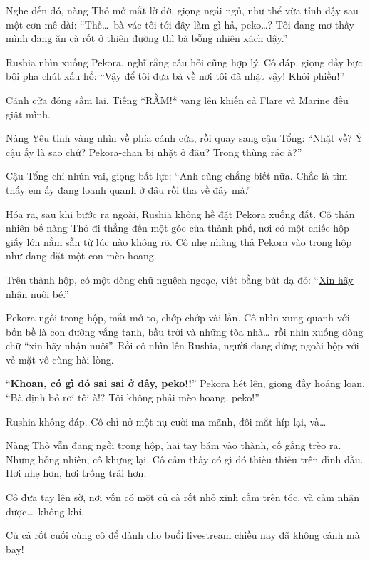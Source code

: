 \documentclass[../main.tex]{subfiles}
\begin{document}
Nghe đến đó, nàng Thỏ mở mắt lờ đờ, giọng ngái ngủ, như thể vừa tỉnh dậy sau một cơn mê dài: ``Thế\dots\ bà vác tôi tới đây làm gì hả, peko\dots? Tôi đang mơ thấy mình đang ăn cà rốt ở thiên đường thì bà bỗng nhiên xách dậy.''


Rushia nhìn xuống Pekora, nghĩ rằng câu hỏi cũng hợp lý. Cô đáp, giọng đầy bực bội pha chút xấu hổ: ``Vậy để tôi đưa bà về nơi tôi đã nhặt vậy! Khỏi phiền!''

Cánh cửa đóng sầm lại. Tiếng *RẦM!* vang lên khiến cả Flare và Marine đều giật mình.

Nàng Yêu tinh vàng nhìn về phía cánh cửa, rồi quay sang cậu Tổng: ``Nhặt về? Ý cậu ấy là sao chứ? Pekora-chan bị nhặt ở đâu? Trong thùng rác à?''

Cậu Tổng chỉ nhún vai, giọng bất lực: ``Anh cũng chẳng biết nữa. Chắc là tìm thấy em ấy đang loanh quanh ở đâu rồi tha về đây mà.''

Hóa ra, sau khi bước ra ngoài, Rushia không hề đặt Pekora xuống đất. Cô thản nhiên bế nàng Thỏ đi thẳng đến một góc của thành phố, nơi có một chiếc hộp giấy lớn nằm sẵn từ lúc nào không rõ. Cô nhẹ nhàng thả Pekora vào trong hộp như đang đặt một con mèo hoang.

Trên thành hộp, có một dòng chữ nguệch ngoạc, viết bằng bút dạ đỏ: ``\uline{Xin hãy nhận nuôi bé.}''


Pekora ngồi trong hộp, mắt mở to, chớp chớp vài lần. Cô nhìn xung quanh với bốn bề là con đường vắng tanh, bầu trời và những tòa nhà\dots\ rồi nhìn xuống dòng chữ ``xin hãy nhận nuôi''. Rồi cô nhìn lên Rushia, người đang đứng ngoài hộp với vẻ mặt vô cùng hài lòng.

``\textbf{Khoan, có gì đó sai sai ở đây, peko!!}'' Pekora hét lên, giọng đầy hoảng loạn. ``Bà định bỏ rơi tôi à!? Tôi không phải mèo hoang, peko!''

Rushia không đáp. Cô chỉ nở một nụ cười ma mãnh, đôi mắt híp lại, và\dots

Nàng Thỏ vẫn đang ngồi trong hộp, hai tay bám vào thành, cố gắng trèo ra. Nhưng bỗng nhiên, cô khựng lại. Cô cảm thấy có gì đó thiếu thiếu trên đỉnh đầu. Hơi nhẹ hơn, hơi trống trải hơn.

Cô đưa tay lên sờ, nơi vốn có một củ cà rốt nhỏ xinh cắm trên tóc, và cảm nhận được\dots\ không khí.

Củ cà rốt cuối cùng cô để dành cho buổi livestream chiều nay đã không cánh mà bay!
\end{document}

